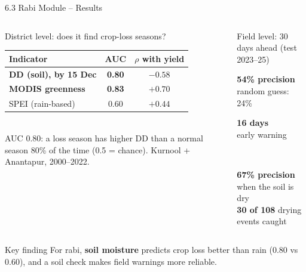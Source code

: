\documentclass[aspectratio=169,10pt]{beamer}
\begin{document}
\begin{frame}{6.3 Rabi Module -- Results}
\begin{columns}[T,onlytextwidth]
\begin{card}{District level: does it find crop-loss seasons?}
\footnotesize
\renewcommand{\arraystretch}{1.12}
\begin{tabularx}{\linewidth}{@{}Ycc@{}}
\toprule
\textbf{Indicator} & \textbf{AUC} & \textbf{$\rho$ with yield} \\ \midrule
\textbf{DD (soil), by 15 Dec} & \textbf{0.80} & $-0.58$ \\
\textbf{MODIS greenness} & \textbf{0.83} & $+0.70$ \\
SPEI (rain-based) & 0.60 & $+0.44$ \\
\bottomrule
\end{tabularx}\\[3pt]
{\scriptsize\color{muted} AUC 0.80: a loss season has higher DD than a normal season 80\% of the time (0.5 = chance). Kurnool + Anantapur, 2000--2022.}
\end{card}
\begin{card}{Field level: 30 days ahead (test 2023--25)}
\centering
\begin{minipage}[t]{0.49\linewidth}\centering
{\color{accent}\bfseries\normalsize 54\% precision}\\[-1pt]{\scriptsize\color{muted} random guess: 24\%}
\end{minipage}\hfill
\begin{minipage}[t]{0.49\linewidth}\centering
{\color{accent}\bfseries\normalsize 16 days}\\[-1pt]{\scriptsize\color{muted} early warning}
\end{minipage}\\[8pt]
\begin{minipage}{0.95\linewidth}\centering\footnotesize
\textbf{67\% precision} when the soil is dry\\[2pt]
\textbf{30 of 108} drying events caught
\end{minipage}
\end{card}
\end{columns}
\vspace{1mm}
\begin{columns}[T,onlytextwidth]
\begin{keycard}{Key finding}
\footnotesize For rabi, \textbf{soil moisture} predicts crop loss better than rain (0.80 vs 0.60), and a soil check makes field warnings more reliable.

\end{keycard}
\end{columns}
\end{frame}
\end{document}
